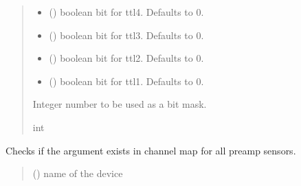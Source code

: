\documentclass[letterpaper,10pt,english]{sphinxmanual}
\begin{document}
\begin{fulllineitems}
\begin{fulllineitems}
\begin{quote}
\begin{description}
\begin{itemize}
\item {} 
\sphinxAtStartPar
{} (\sphinxstyleliteralemphasis{\sphinxupquote{, }}) \textendash{} boolean bit for ttl4. Defaults to 0.

\item {} 
\sphinxAtStartPar
{} (\sphinxstyleliteralemphasis{\sphinxupquote{, }}) \textendash{} boolean bit for ttl3. Defaults to 0.

\item {} 
\sphinxAtStartPar
{} (\sphinxstyleliteralemphasis{\sphinxupquote{, }}) \textendash{} boolean bit for ttl2. Defaults to 0.

\item {} 
\sphinxAtStartPar
{} (\sphinxstyleliteralemphasis{\sphinxupquote{, }}) \textendash{} boolean bit for ttl1. Defaults to 0.

\end{itemize}

\sphinxAtStartPar
Integer number to be used as a bit mask.

\sphinxAtStartPar
int

\end{description}\end{quote}

\end{fulllineitems}


\begin{fulllineitems}
\label{\detokenize{PodDevice_8401HR:PodDevice_8401HR.POD_8401HR.IsPreampDeviceSupported}}
\pysigstartsignatures
{}
\pysigstopsignatures
\sphinxAtStartPar
Checks if the argument exists in channel map for all preamp sensors.
\begin{quote}\begin{description}
\sphinxAtStartPar
{} () \textendash{} name of the device


\end{description}
\end{quote}
\end{fulllineitems}
\end{fulllineitems}
\end{document}
